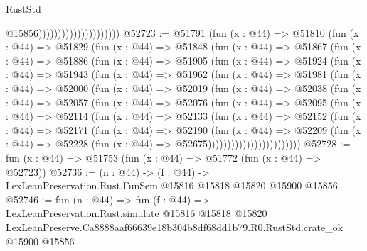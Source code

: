 \begin{lexlean}{RustStd}
\begin{coremodule}
                                              @15856)))))))))))))))))))))
@52723 := @51791
    (fun (x : @44) =>
    @51810
      (fun (x : @44) =>
      @51829
        (fun (x : @44) =>
        @51848
          (fun (x : @44) =>
          @51867
            (fun (x : @44) =>
            @51886
              (fun (x : @44) =>
              @51905
                (fun (x : @44) =>
                @51924
                  (fun (x : @44) =>
                  @51943
                    (fun (x : @44) =>
                    @51962
                      (fun (x : @44) =>
                      @51981
                        (fun (x : @44) =>
                        @52000
                          (fun (x : @44) =>
                          @52019
                            (fun (x : @44) =>
                            @52038
                              (fun (x : @44) =>
                              @52057
                                (fun (x : @44) =>
                                @52076
                                  (fun (x : @44) =>
                                  @52095
                                    (fun (x : @44) =>
                                    @52114
                                      (fun (x : @44) =>
                                      @52133
                                        (fun (x : @44) =>
                                        @52152
                                          (fun (x : @44) =>
                                          @52171
                                            (fun (x : @44) =>
                                            @52190
                                              (fun (x : @44) =>
                                              @52209
                                                (fun (x : @44) =>
                                                @52228
                                                  (fun (x : @44) => @52675))))))))))))))))))))))))
@52728 := fun (x : @44) => @51753 (fun (x : @44) => @51772 (fun (x : @44) => @52723))
@52736 := (n : @44) ->
  (f : @44) -> LexLeanPreservation.Rust.FunSem @15816 @15818 @15820 @15900 @15856
@52746 := fun (n : @44) =>
  fun (f : @44) =>
  LexLeanPreservation.Rust.simulate
    @15816
    @15818
    @15820
    LexLeanPreserve.Ca8888aaf66639e18b304b8df68dd1b79.R0.RustStd.crate_ok
    @15900
    @15856
\end{coremodule}
\end{lexlean}
